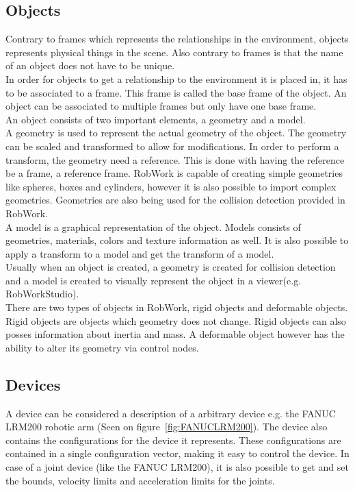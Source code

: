 \subsection{Objects}
Contrary to frames which represents the relationships in the environment, objects represents physical things in the scene. Also contrary to frames is that the name of an object does not have to be unique.\\

In order for objects to get a relationship to the environment it is placed in, it has to be associated to a frame. This frame is called the base frame of the object. An object can be associated to multiple frames but only have one base frame.\\

An object consists of two important elements, a geometry and a model.\\
A geometry is used to represent the actual geometry of the object. The geometry can be scaled and transformed to allow for modifications. In order to perform a transform, the geometry need a reference. This is done with having the reference be a frame, a reference frame. RobWork is capable of creating simple geometries like spheres, boxes and cylinders, however it is also possible to import complex geometries. Geometries are also being used for the collision detection provided in RobWork.\\
A model is a graphical representation of the object. Models consists of geometries, materials, colors and texture information as well. It is also possible to apply a transform to a model and get the transform of a model.\\
Usually when an object is created, a geometry is created for collision detection and a model is created to visually represent the object in a viewer(e.g. RobWorkStudio).\\

There are two types of objects in RobWork, rigid objects and deformable objects. Rigid objects are objects which  geometry does not change. Rigid objects can also posses information about inertia and mass. A deformable object however has the ability to alter its geometry via control nodes.


\subsection{Devices}
A device can be considered a description of a arbitrary device e.g. the FANUC LRM200 robotic arm (Seen on figure~\ref{fig:FANUCLRM200}). The device also contains the configurations for the device it represents. These configurations are contained in a single configuration vector, making it easy to control the device. In case of a joint device (like the FANUC LRM200), it is also possible to get and set the bounds, velocity limits and acceleration limits for the joints.\\

